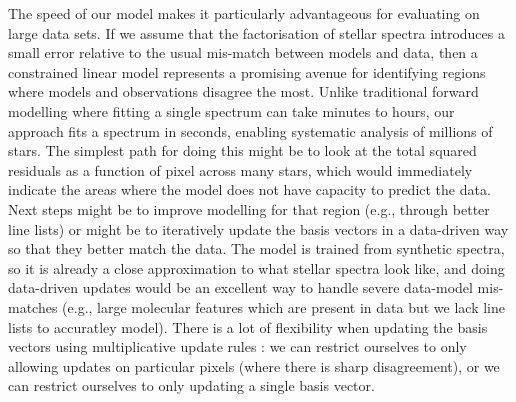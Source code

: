 \documentclass[modern,linenumbers]{aastex631}
\renewcommand{\added}[1]{#1}
\begin{document}
The speed of our model makes it particularly advantageous for evaluating on large data sets. If we assume that the factorisation of stellar spectra introduces a small error relative to the usual mis-match between models and data, then a constrained linear model represents a promising avenue for identifying regions where models and observations disagree the most. \added{Unlike traditional forward modelling where fitting a single spectrum can take minutes to hours, our approach fits a spectrum in seconds, enabling systematic analysis of millions of stars.} The simplest path for doing this might be to look at the total squared residuals as a function of pixel across many stars, which would immediately indicate the areas where the model does not have capacity to predict the data. Next steps might be to improve modelling for that region (e.g., through better line lists) or might be to iteratively update the basis vectors in a data-driven way so that they better match the data. The model is trained from synthetic spectra, so it is already a close approximation to what stellar spectra look like, and doing data-driven updates would be an excellent way to handle severe data-model mis-matches (e.g., large molecular features which are present in data but we lack line lists to accuratley model). There is a lot of flexibility when updating the basis vectors using multiplicative update rules \citep{Blanton:2007}: we can restrict ourselves to only allowing updates on particular pixels (where there is sharp disagreement), or we can restrict ourselves to only updating a single basis vector. \\
\end{document}
